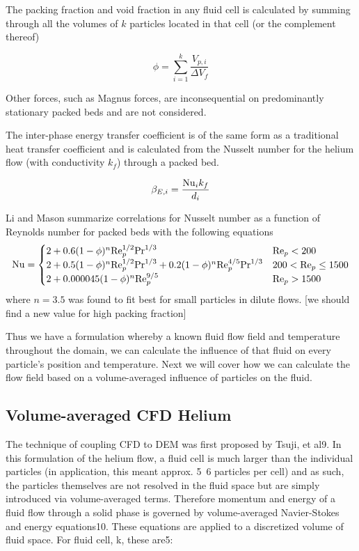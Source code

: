 The packing fraction and  void fraction in any fluid cell is calculated by summing through all the volumes of $k$ particles located in that cell (or the complement thereof)

\begin{equation}
	\phi = \sum_{i=1}^k \frac{V_{p,i}}{\Delta V_f}
\end{equation}

Other forces, such as Magnus forces, are inconsequential on predominantly stationary packed beds and are not considered.



The inter-phase energy transfer coefficient is of the same form as a traditional heat transfer coefficient and is calculated from the Nusselt number for the helium flow (with conductivity $k_f$) through a packed bed.

\begin{equation}
	\beta_{E,i} = \frac{\mathrm{Nu}_i k_f}{d_i}
\end{equation}

Li and Mason\cite{Li2000} summarize correlations for Nusselt number as a function of Reynolds number for packed beds with the following equations
\[
\mathrm{Nu}= 
\begin{cases}
    2 + 0.6(1-\phi)^n\mathrm{Re}_p^{1/2}\mathrm{Pr}^{1/3}											& \mathrm{Re}_p < 200 \\
    2 + 0.5(1-\phi)^n\mathrm{Re}_p^{1/2}\mathrm{Pr}^{1/3} + 0.2(1-\phi)^n\mathrm{Re}_p^{4/5}\mathrm{Pr}^{1/3}   & 200 < \mathrm{Re}_p \le 1500 \\
    2 + 0.000045(1-\phi)^n\mathrm{Re}_p^{9/5}												& \mathrm{Re}_p > 1500
\end{cases}
\]
where $n=3.5$ was found to fit best for small particles in dilute flows. [we should find a new value for high packing fraction] 

Thus we have a formulation whereby a known fluid flow field and temperature throughout the domain, we can calculate the influence of that fluid on every particle’s position and temperature. Next we will cover how we can calculate the flow field based on a volume-averaged influence of particles on the fluid.




\subsection{Volume-averaged CFD Helium}
The technique of coupling CFD to DEM was first proposed by Tsuji, et al9. In this formulation of the helium flow, a fluid cell is much larger than the individual particles (in application, this meant approx. 5~6 particles per cell) and as such, the particles themselves are not resolved in the fluid space but are simply introduced via volume-averaged terms. Therefore momentum and energy of a fluid flow through a solid phase is governed by volume-averaged Navier-Stokes and energy equations10. These equations are applied to a discretized volume of fluid space. For fluid cell, k, these are5:



